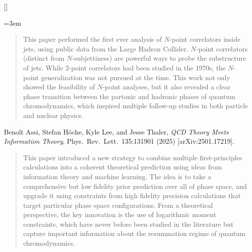 \begin{list}{[]\addtocounter{jessecount}{1}}{\leftmargin=3em \itemsep=4pt}
\begin{quote}
This paper performed the first ever analysis of $N$-point correlators inside jets, using public data from the Large Hadron Collider.  $N$-point correlators (distinct from $N$-subjettiness) are powerful ways to probe the substructure of jets.  While $2$-point correlators had been studied in the 1970s, the $N$-point generalization was not pursued at the time.  This work not only showed the feasibility of $N$-point analyses, but it also revealed a clear phase transition between the partonic and hadronic phases of quantum chromodynamics, which inspired multiple follow-up studies in both particle and nuclear physics.
\end{quote}
\item
 Benoît Assi, Stefan Höche, Kyle Lee, and Jesse Thaler,
\emph{QCD Theory Meets Information Theory},
Phys.\ Rev.\ Lett.\ 135:131901 (2025)
[arXiv:2501.17219].

\begin{quote}
This paper introduced a new strategy to combine multiple first-principles calculations into a coherent theoretical prediction using ideas from information theory and machine learning.  The idea is to take a comprehensive but low fidelity prior prediction over all of phase space, and upgrade it using constraints from high fidelity precision calculations that target particular phase space configurations.  From a theoretical perspective, the key innovation is the use of logarithmic moment constraints, which have never before been studied in the literature but capture important information about the resummation regime of quantum chromodynamics.
\end{quote}
\end{list}
